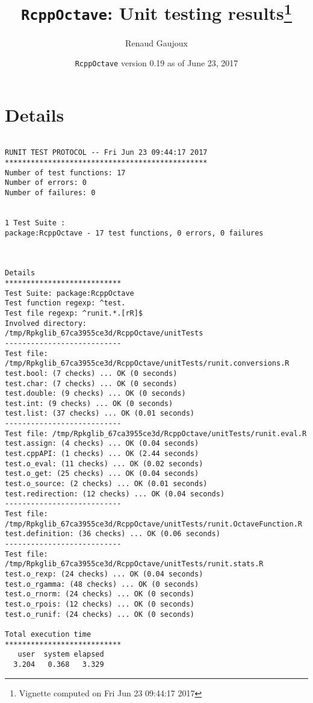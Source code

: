 \documentclass[10pt]{article}\usepackage[]{graphicx}\usepackage[]{color}
\author{Renaud Gaujoux}
\title{\texttt{RcppOctave}: Unit testing results\footnote{Vignette computed  on Fri Jun 23 09:44:17 2017}}
\date{\texttt{RcppOctave} version 0.19 as of June 23, 2017}
\begin{document}
\maketitle

\section{Details}
\begin{verbatim}

RUNIT TEST PROTOCOL -- Fri Jun 23 09:44:17 2017 
*********************************************** 
Number of test functions: 17 
Number of errors: 0 
Number of failures: 0 

 
1 Test Suite : 
package:RcppOctave - 17 test functions, 0 errors, 0 failures



Details 
*************************** 
Test Suite: package:RcppOctave 
Test function regexp: ^test. 
Test file regexp: ^runit.*.[rR]$ 
Involved directory: 
/tmp/Rpkglib_67ca3955ce3d/RcppOctave/unitTests 
--------------------------- 
Test file: /tmp/Rpkglib_67ca3955ce3d/RcppOctave/unitTests/runit.conversions.R 
test.bool: (7 checks) ... OK (0 seconds)
test.char: (7 checks) ... OK (0 seconds)
test.double: (9 checks) ... OK (0 seconds)
test.int: (9 checks) ... OK (0 seconds)
test.list: (37 checks) ... OK (0.01 seconds)
--------------------------- 
Test file: /tmp/Rpkglib_67ca3955ce3d/RcppOctave/unitTests/runit.eval.R 
test.assign: (4 checks) ... OK (0.04 seconds)
test.cppAPI: (1 checks) ... OK (2.44 seconds)
test.o_eval: (11 checks) ... OK (0.02 seconds)
test.o_get: (25 checks) ... OK (0.04 seconds)
test.o_source: (2 checks) ... OK (0.01 seconds)
test.redirection: (12 checks) ... OK (0.04 seconds)
--------------------------- 
Test file: /tmp/Rpkglib_67ca3955ce3d/RcppOctave/unitTests/runit.OctaveFunction.R 
test.definition: (36 checks) ... OK (0.06 seconds)
--------------------------- 
Test file: /tmp/Rpkglib_67ca3955ce3d/RcppOctave/unitTests/runit.stats.R 
test.o_rexp: (24 checks) ... OK (0.04 seconds)
test.o_rgamma: (48 checks) ... OK (0 seconds)
test.o_rnorm: (24 checks) ... OK (0 seconds)
test.o_rpois: (12 checks) ... OK (0 seconds)
test.o_runif: (24 checks) ... OK (0 seconds)

Total execution time
***************************
   user  system elapsed 
  3.204   0.368   3.329 

\end{verbatim}
\end{document}
